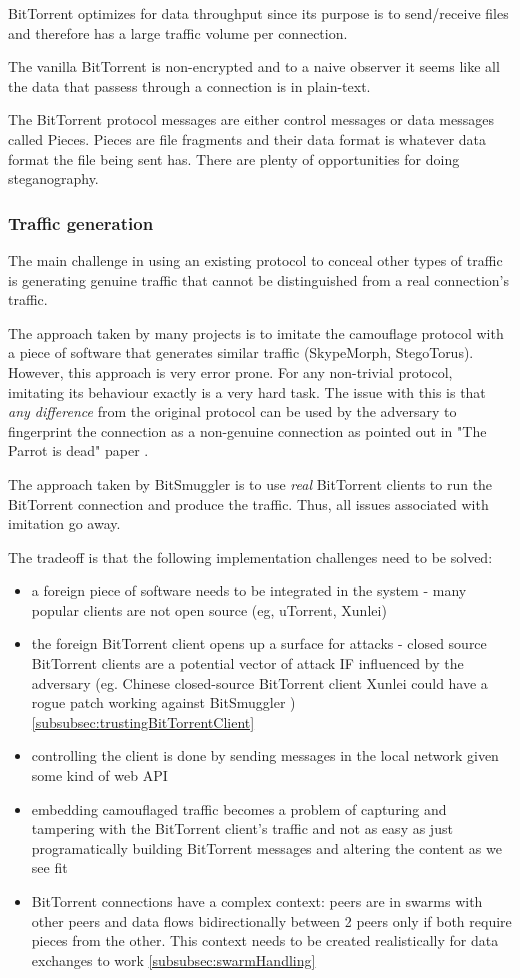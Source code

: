 \documentclass[11pt]{article} %
\newcommand{\projectName}{BitSmuggler }
\begin{document}
BitTorrent optimizes for data throughput since its purpose is to send/receive files and therefore has a large traffic volume per connection.

The vanilla BitTorrent is non-encrypted and to a naive observer it seems like all the data that passess through a connection is in plain-text.

The BitTorrent protocol messages are either control messages or data messages called Pieces. Pieces are file fragments and their data format is whatever data format the file being sent has. There are plenty of opportunities for doing steganography.


\subsubsection{Traffic generation}

The main challenge in using an existing protocol to conceal other types of traffic is generating genuine traffic that cannot be distinguished from a real connection's traffic.

The approach taken by many projects is to imitate the camouflage protocol with a piece of software that generates similar traffic (SkypeMorph, StegoTorus). However, this approach is very error prone. For any non-trivial protocol, imitating its behaviour exactly is a very hard task. The issue with this is that \textit{any difference} from the original protocol can be used by the adversary to fingerprint the connection as a non-genuine connection as pointed out in "The Parrot is dead" paper  \citep*{deadParrot}.

The approach taken by \projectName is to use \textit{real} BitTorrent clients to run the BitTorrent connection and produce the traffic. Thus, all issues associated with imitation go away.

The tradeoff is that the following implementation challenges need to be solved:
\begin{itemize}
\item a foreign piece of software needs to be integrated in the system - many popular clients are not open source (eg, uTorrent, Xunlei)
\item the foreign BitTorrent client opens up a surface for attacks - closed source BitTorrent clients are a potential vector of attack IF influenced by the adversary (eg. Chinese closed-source BitTorrent client Xunlei could have a rogue patch working against \projectName) \ref{subsubsec:trustingBitTorrentClient}
\item controlling the client is done by sending messages in the local network given some kind of web API
\item embedding camouflaged traffic becomes a problem of capturing and tampering with the BitTorrent client's traffic and not as easy as just programatically building BitTorrent messages and altering the content as we see fit
\item BitTorrent connections have a complex context: peers are in swarms with other peers and data flows bidirectionally between 2 peers only if both require pieces from the other. This context needs to be created realistically for data exchanges to work \ref{subsubsec:swarmHandling}
\end{itemize}
\end{document}
